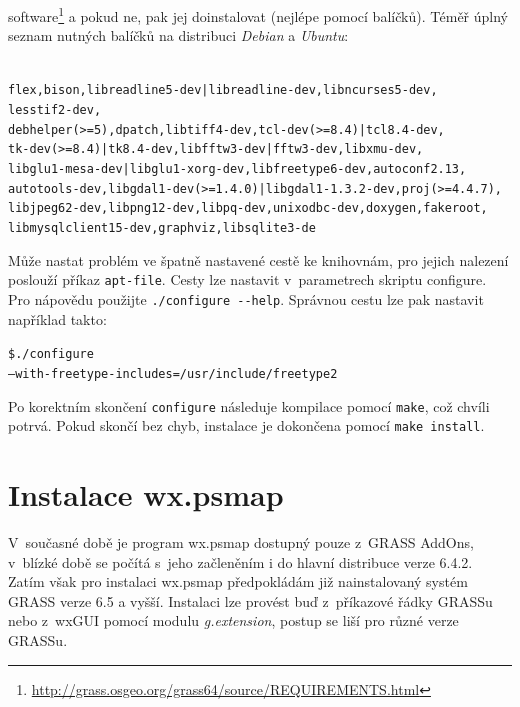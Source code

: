 \documentclass[a4paper,12pt,draft]{article}
\begin{document}
software\footnote{\url{http://grass.osgeo.org/grass64/source/REQUIREMENTS.html}}
a pokud ne, pak jej doinstalovat (nejlépe pomocí balíčků). Téměř
úplný seznam nutných balíčků na distribuci \emph{Debian} a \emph{Ubuntu}:
\begin{alltt}
{\footnotesize
flex, bison, libreadline5-dev | libreadline-dev, libncurses5-dev,
lesstif2-dev,
debhelper (>= 5), dpatch, libtiff4-dev, tcl-dev (>= 8.4) | tcl8.4-dev,
tk-dev (>= 8.4) | tk8.4-dev, libfftw3-dev|fftw3-dev, libxmu-dev,
libglu1-mesa-dev | libglu1-xorg-dev, libfreetype6-dev, autoconf2.13,
autotools-dev, libgdal1-dev (>=1.4.0) | libgdal1-1.3.2-dev, proj (>= 4.4.7),
libjpeg62-dev, libpng12-dev, libpq-dev, unixodbc-dev, doxygen, fakeroot,
libmysqlclient15-dev, graphviz, libsqlite3-de
}
\end{alltt}
Může nastat problém ve špatně nastavené cestě ke knihovnám, pro
jejich nalezení poslouží příkaz \verb|apt-file|. Cesty lze nastavit
v~parametrech skriptu configure.
Pro nápovědu použijte \verb|./configure --help|.
Správnou cestu lze pak nastavit například takto:
\begin{alltt}
{\footnotesize \$ ./configure
--with-freetype-includes=/usr/include/freetype2
}
\end{alltt}

Po korektním skončení \verb|configure| následuje kompilace pomocí
\verb|make|, což chvíli potrvá. Pokud skončí bez chyb, instalace je
dokončena pomocí \verb|make install|.


\section{Instalace wx.psmap}
\label{priloha:instalace_GUI}
V~současné době je program wx.psmap dostupný pouze z~GRASS AddOns, v~blízké
době se počítá s~jeho začleněním i do hlavní distribuce verze 6.4.2. Zatím však
pro instalaci wx.psmap předpokládám již nainstalovaný systém GRASS verze 6.5
a vyšší. Instalaci lze provést buď z~příkazové řádky GRASSu nebo z~wxGUI pomocí
modulu \emph{g.extension}, postup se liší pro různé verze GRASSu.
\end{document}
